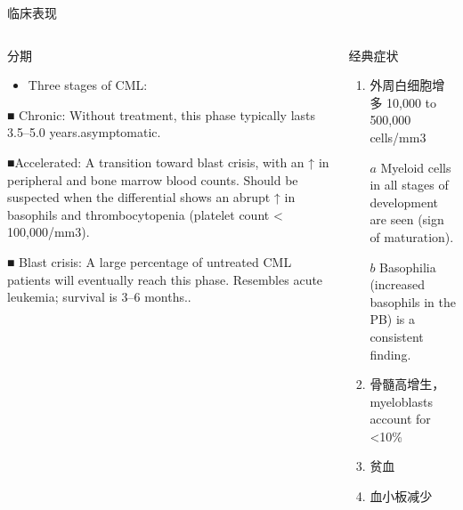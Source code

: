 \documentclass[
  ignorenonframetext,
]{beamer}
\providecommand{\tightlist}{%
  \setlength{\itemsep}{0pt}\setlength{\parskip}{0pt}}
\begin{document}
\begin{frame}
\begin{block}{临床表现}
\protect\hypertarget{ux4e34ux5e8aux8868ux73b0-1}{}
\end{block}

\begin{columns}[T]
\begin{column}{0.3\textwidth}
\begin{block}{分期}
\protect\hypertarget{ux5206ux671f}{}
\begin{itemize}
\tightlist
\item
  Three stages of CML:
\end{itemize}

■ Chronic: Without treatment, this phase typically lasts 3.5--5.0
years.asymptomatic.

■Accelerated: A transition toward blast crisis, with an ↑ in peripheral
and bone marrow blood counts. Should be suspected when the differential
shows an abrupt ↑ in basophils and thrombocytopenia (platelet count
\textless{} 100,000/mm3).

■ Blast crisis: A large percentage of untreated CML patients will
eventually reach this phase. Resembles acute leukemia; survival is 3--6
months..
\end{block}
\end{column}

\begin{column}{0.3\textwidth}
\begin{block}{经典症状}
\protect\hypertarget{ux7ecfux5178ux75c7ux72b6}{}
\begin{enumerate}
\item
  外周白细胞增多 10,000 to 500,000 cells/mm3

  \(a\) Myeloid cells in all stages of development are seen (sign of
  maturation).

  \(b\) Basophilia (increased basophils in the PB) is a consistent
  finding.
\item
  骨髓高增生，myeloblasts account for \textless10\%
\item
  贫血
\item
  血小板减少
\end{enumerate}
\end{block}
\end{column}


\end{columns}
\end{frame}
\end{document}
